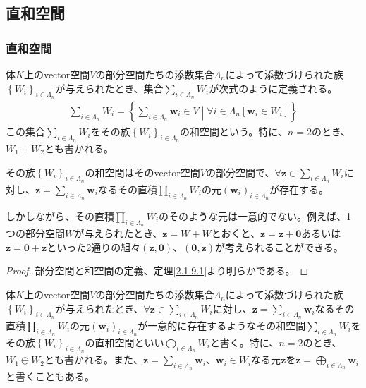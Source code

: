 \documentclass[dvipdfmx]{jsarticle}
\begin{document}
\subsection{直和空間}%
\subsubsection{直和空間}%
\begin{dfn}
体$K$上のvector空間$V$の部分空間たちの添数集合$\varLambda_{n}$によって添数づけられた族$\left\{ W_{i} \right\}_{i \in \varLambda_{n}}$が与えられたとき、集合$\sum_{i \in \varLambda_{n}} W_{i}$が次式のように定義される。
\begin{align*}
\sum_{i \in \varLambda_{n}} W_{i} = \left\{ \sum_{i \in \varLambda_{n}} \mathbf{w}_{i} \in V \middle| \forall i \in \varLambda_{n}\left[ \mathbf{w}_{i} \in W_{i} \right] \right\}
\end{align*}
この集合$\sum_{i \in \varLambda_{n}} W_{i}$をその族$\left\{ W_{i} \right\}_{i \in \varLambda_{n}}$の和空間という。特に、$n = 2$のとき、$W_{1} + W_{2}$とも書かれる。
\end{dfn}
\begin{thm}\label{2.2.1.1}
その族$\left\{ W_{i} \right\}_{i \in \varLambda_{n}}$の和空間はそのvector空間$V$の部分空間で、$\forall\mathbf{z} \in \sum_{i \in \varLambda_{n}} W_{i}$に対し、$\mathbf{z} = \sum_{i \in \varLambda_{n}} \mathbf{w}_{i}$なるその直積$\prod_{i \in \varLambda_{n}} W_{i}$の元$\left( \mathbf{w}_{i} \right)_{i \in \varLambda_{n}}$が存在する。
\end{thm}\par
しかしながら、その直積$\prod_{i \in \varLambda_{n}} W_{i}$のそのような元は一意的でない。例えば、1つの部分空間$W$が与えられたとき、$\mathbf{z} = W + W$とおくと、$\mathbf{z} = \mathbf{z} + \mathbf{0}$あるいは$\mathbf{z} = \mathbf{0} + \mathbf{z}$といった2通りの組々$\left( \mathbf{z},\mathbf{0} \right)$、$\left( \mathbf{0},\mathbf{z} \right)$が考えられることができる。
\begin{proof} 部分空間と和空間の定義、定理\ref{2.1.9.1}より明らかである。
\end{proof}
\begin{dfn}
体$K$上のvector空間$V$の部分空間たちの添数集合$\varLambda_{n}$によって添数づけられた族$\left\{ W_{i} \right\}_{i \in \varLambda_{n}}$が与えられたとき、$\forall\mathbf{z} \in \sum_{i \in \varLambda_{n}} W_{i}$に対し、$\mathbf{z} = \sum_{i \in \varLambda_{n}} \mathbf{w}_{i}$なるその直積$\prod_{i \in \varLambda_{n}} W_{i}$の元$\left( \mathbf{w}_{i} \right)_{i \in \varLambda_{n}}$が一意的に存在するようなその和空間$\sum_{i \in \varLambda_{n}} W_{i}$をその族$\left\{ W_{i} \right\}_{i \in \varLambda_{n}}$の直和空間といい$\bigoplus_{i \in \varLambda_{n}} W_{i}$と書く。特に、$n = 2$のとき、$W_{1} \oplus W_{2}$とも書かれる。また、$\mathbf{z} = \sum_{i \in \varLambda_{n}} \mathbf{w}_{i}$、$\mathbf{w}_{i} \in W_{i}$なる元$\mathbf{z}$を$\mathbf{z} = \bigoplus_{i \in \varLambda_{n}} \mathbf{w}_{i}$と書くこともある。
\end{dfn}
\end{document}
